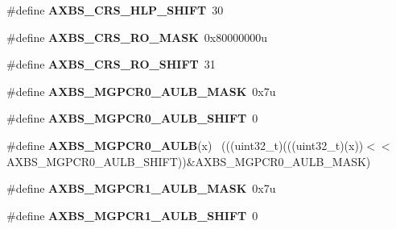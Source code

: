 \begin{DoxyCompactItemize}
\item 
\hypertarget{group___a_x_b_s___register___masks_ga6cf361c996f63fd5cc169c352971bcd2}{}\#define {\bfseries A\+X\+B\+S\+\_\+\+C\+R\+S\+\_\+\+H\+L\+P\+\_\+\+S\+H\+I\+F\+T}~30\label{group___a_x_b_s___register___masks_ga6cf361c996f63fd5cc169c352971bcd2}

\item 
\hypertarget{group___a_x_b_s___register___masks_gac511a1f4f6590cd86da388390b2993b5}{}\#define {\bfseries A\+X\+B\+S\+\_\+\+C\+R\+S\+\_\+\+R\+O\+\_\+\+M\+A\+S\+K}~0x80000000u\label{group___a_x_b_s___register___masks_gac511a1f4f6590cd86da388390b2993b5}

\item 
\hypertarget{group___a_x_b_s___register___masks_ga51572e77d4fe6c519be097a8e6324331}{}\#define {\bfseries A\+X\+B\+S\+\_\+\+C\+R\+S\+\_\+\+R\+O\+\_\+\+S\+H\+I\+F\+T}~31\label{group___a_x_b_s___register___masks_ga51572e77d4fe6c519be097a8e6324331}

\item 
\hypertarget{group___a_x_b_s___register___masks_ga161e38235a1d3154067e078e559202fd}{}\#define {\bfseries A\+X\+B\+S\+\_\+\+M\+G\+P\+C\+R0\+\_\+\+A\+U\+L\+B\+\_\+\+M\+A\+S\+K}~0x7u\label{group___a_x_b_s___register___masks_ga161e38235a1d3154067e078e559202fd}

\item 
\hypertarget{group___a_x_b_s___register___masks_ga2c00c30d63906c765a6df81778e2fb4f}{}\#define {\bfseries A\+X\+B\+S\+\_\+\+M\+G\+P\+C\+R0\+\_\+\+A\+U\+L\+B\+\_\+\+S\+H\+I\+F\+T}~0\label{group___a_x_b_s___register___masks_ga2c00c30d63906c765a6df81778e2fb4f}

\item 
\hypertarget{group___a_x_b_s___register___masks_ga934e66d76e8d9cf8177705cadff67976}{}\#define {\bfseries A\+X\+B\+S\+\_\+\+M\+G\+P\+C\+R0\+\_\+\+A\+U\+L\+B}(x)                                        ~(((uint32\+\_\+t)(((uint32\+\_\+t)(x))$<$$<$A\+X\+B\+S\+\_\+\+M\+G\+P\+C\+R0\+\_\+\+A\+U\+L\+B\+\_\+\+S\+H\+I\+F\+T))\&A\+X\+B\+S\+\_\+\+M\+G\+P\+C\+R0\+\_\+\+A\+U\+L\+B\+\_\+\+M\+A\+S\+K)\label{group___a_x_b_s___register___masks_ga934e66d76e8d9cf8177705cadff67976}

\item 
\hypertarget{group___a_x_b_s___register___masks_gaefd2ffd8d80f4eb9fd14f3c5a3a7b629}{}\#define {\bfseries A\+X\+B\+S\+\_\+\+M\+G\+P\+C\+R1\+\_\+\+A\+U\+L\+B\+\_\+\+M\+A\+S\+K}~0x7u\label{group___a_x_b_s___register___masks_gaefd2ffd8d80f4eb9fd14f3c5a3a7b629}

\item 
\hypertarget{group___a_x_b_s___register___masks_gab45b6c2302bbf061fd1c43d436659bd7}{}\#define {\bfseries A\+X\+B\+S\+\_\+\+M\+G\+P\+C\+R1\+\_\+\+A\+U\+L\+B\+\_\+\+S\+H\+I\+F\+T}~0\label{group___a_x_b_s___register___masks_gab45b6c2302bbf061fd1c43d436659bd7}


\end{DoxyCompactItemize}
